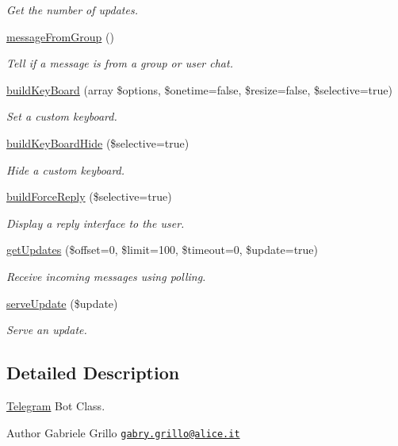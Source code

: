 \begin{DoxyCompactItemize}
\begin{DoxyCompactList}\small\item\em Get the number of updates. \end{DoxyCompactList}\item 
\hyperlink{class_telegram_a59b7bf91ea3b26d732f7536c2d65da19}{message\+From\+Group} ()
\begin{DoxyCompactList}\small\item\em Tell if a message is from a group or user chat. \end{DoxyCompactList}\item 
\hyperlink{class_telegram_a5c9619923ae1810aa340fa0e9acc1744}{build\+Key\+Board} (array \$options, \$onetime=false, \$resize=false, \$selective=true)
\begin{DoxyCompactList}\small\item\em Set a custom keyboard. \end{DoxyCompactList}\item 
\hyperlink{class_telegram_a3a02a8bbaf6021f98871752bfd32de97}{build\+Key\+Board\+Hide} (\$selective=true)
\begin{DoxyCompactList}\small\item\em Hide a custom keyboard. \end{DoxyCompactList}\item 
\hyperlink{class_telegram_a34cfc8575c348ca3dd168b9611af4f1c}{build\+Force\+Reply} (\$selective=true)
\begin{DoxyCompactList}\small\item\em Display a reply interface to the user. \end{DoxyCompactList}\item 
\hyperlink{class_telegram_adb467486d3d5e83ce21a03e00f17b16c}{get\+Updates} (\$offset=0, \$limit=100, \$timeout=0, \$update=true)
\begin{DoxyCompactList}\small\item\em Receive incoming messages using polling. \end{DoxyCompactList}\item 
\hyperlink{class_telegram_a57e6066940e4cca7310cfd5c45fd8510}{serve\+Update} (\$update)
\begin{DoxyCompactList}\small\item\em Serve an update. \end{DoxyCompactList}\end{DoxyCompactItemize}


\subsection{Detailed Description}
\hyperlink{class_telegram}{Telegram} Bot Class. \begin{DoxyAuthor}{Author}
Gabriele Grillo \href{mailto:gabry.grillo@alice.it}{\tt gabry.\+grillo@alice.\+it} 
\end{DoxyAuthor}


